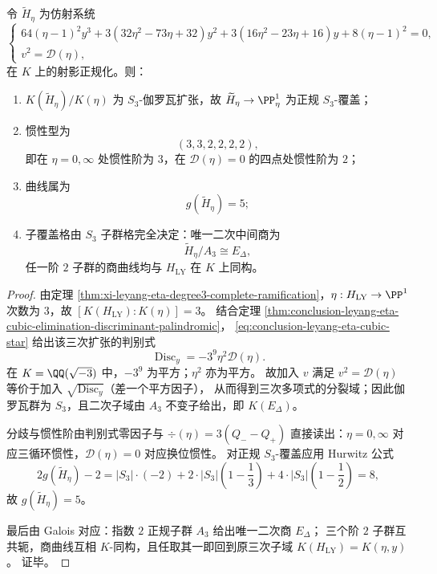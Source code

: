 \begin{theorem}\label{thm:conclusion-leyang-eta-s3-galois-closure-genus5-lattice}
令 \(\widetilde H_\eta\) 为仿射系统
\begin{equation}\label{eq:conclusion-leyang-eta-s3-galois-system}
\begin{cases}
64(\eta-1)^2y^3
+3(32\eta^2-73\eta+32)y^2
+3(16\eta^2-23\eta+16)y
+8(\eta-1)^2=0,\\[1mm]
v^2=\mathscr D(\eta),
\end{cases}
\end{equation}
在 \(K\) 上的射影正规化。则：
\begin{enumerate}
  \item \(K(\widetilde H_\eta)/K(\eta)\) 为 \(S_3\)-伽罗瓦扩张，故 \(\widetilde H_\eta\to\PP^1_\eta\) 为正规 \(S_3\)-覆盖；
  \item 惯性型为
  \[
  (3,3,2,2,2,2),
  \]
  即在 \(\eta=0,\infty\) 处惯性阶为 \(3\)，在 \(\mathscr D(\eta)=0\) 的四点处惯性阶为 \(2\)；
  \item 曲线属为
  \[
  g(\widetilde H_\eta)=5;
  \]
  \item 子覆盖格由 \(S_3\) 子群格完全决定：唯一二次中间商为
  \[
  \widetilde H_\eta/A_3\cong E_\Delta,
  \]
  任一阶 \(2\) 子群的商曲线均与 \(H_{\mathrm{LY}}\) 在 \(K\) 上同构。
\end{enumerate}
\end{theorem}
\begin{proof}
由定理 \ref{thm:xi-leyang-eta-degree3-complete-ramification}，\(\eta:H_{\mathrm{LY}}\to\PP^1\) 次数为 \(3\)，故
\(
[K(H_{\mathrm{LY}}):K(\eta)]=3
\)。
结合定理 \ref{thm:conclusion-leyang-eta-cubic-elimination-discriminant-palindromic}，
\eqref{eq:conclusion-leyang-eta-cubic-star} 给出该三次扩张的判别式
\[
\operatorname{Disc}_{y}=-3^9\eta^2\mathscr D(\eta).
\]
在 \(K=\QQ(\sqrt{-3})\) 中，\(-3^9\) 为平方；\(\eta^2\) 亦为平方。
故加入 \(v\) 满足 \(v^2=\mathscr D(\eta)\) 等价于加入 \(\sqrt{\operatorname{Disc}_{y}}\)（差一个平方因子），
从而得到三次多项式的分裂域；因此伽罗瓦群为 \(S_3\)，且二次子域由 \(A_3\) 不变子给出，即 \(K(E_\Delta)\)。

分歧与惯性阶由判别式零因子与 \(\div(\eta)=3(Q_--Q_+)\) 直接读出：\(\eta=0,\infty\) 对应三循环惯性，\(\mathscr D(\eta)=0\) 对应换位惯性。
对正规 \(S_3\)-覆盖应用 Hurwitz 公式
\[
2g(\widetilde H_\eta)-2
=|S_3|\cdot(-2)
+2\cdot |S_3|\!\left(1-\frac13\right)
+4\cdot |S_3|\!\left(1-\frac12\right)
=8,
\]
故 \(g(\widetilde H_\eta)=5\)。

最后由 Galois 对应：指数 \(2\) 正规子群 \(A_3\) 给出唯一二次商 \(E_\Delta\)；
三个阶 \(2\) 子群互共轭，商曲线互相 \(K\)-同构，且任取其一即回到原三次子域 \(K(H_{\mathrm{LY}})=K(\eta,y)\)。
证毕。
\end{proof}

